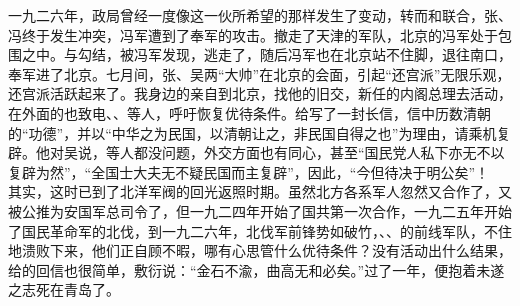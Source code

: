 一九二六年，政局曾经一度像这一伙所希望的那样发生了变动，转而和联合，张、冯终于发生冲突，冯军遭到了奉军的攻击。撤走了天津的军队，北京的冯军处于包围之中。与勾结，被冯军发现，逃走了，随后冯军也在北京站不住脚，退往南口，奉军进了北京。七月间，张、吴两“大帅”在北京的会面，引起“还宫派”无限乐观，还宫派活跃起来了。我身边的亲自到北京，找他的旧交，新任的内阁总理去活动，在外面的也致电、、等人，呼吁恢复优待条件。给写了一封长信，信中历数清朝的“功德”，并以“中华之为民国，以清朝让之，非民国自得之也”为理由，请乘机复辟。他对吴说，等人都没问题，外交方面也有同心，甚至“国民党人私下亦无不以复辟为然”，“全国士大夫无不疑民国而主复辟”，因此，“今但待决于明公矣”！\\

其实，这时已到了北洋军阀的回光返照时期。虽然北方各系军人忽然又合作了，又被公推为安国军总司令了，但一九二四年开始了国共第一次合作，一九二五年开始了国民革命军的北伐，到一九二六年，北伐军前锋势如破竹，、、的前线军队，不住地溃败下来，他们正自顾不暇，哪有心思管什么优待条件？没有活动出什么结果，给的回信也很简单，敷衍说：“金石不渝，曲高无和必矣。”过了一年，便抱着未遂之志死在青岛了。\\

